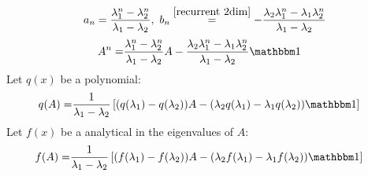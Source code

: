 \documentclass{article}
\begin{document}
\begin{align}
a_n = \frac {\lambda_1^n - \lambda_2^n}{\lambda_1 - \lambda_2},\ b_n \overset{\eqref{recurrent 2dim}}=-\frac {\lambda_2\lambda_1^n - \lambda_1\lambda_2^n}{\lambda_1 - \lambda_2}
\end{align}
\begin{align}
A^n =& \frac {\lambda_1^n - \lambda_2^n}{\lambda_1 - \lambda_2} A - \frac {\lambda_2\lambda_1^n - \lambda_1\lambda_2^n}{\lambda_1 - \lambda_2} \mathbbm 1
\end{align}
Let $q(x)$ be a polynomial:
\begin{align}
q(A) =& \frac 1{\lambda_1 - \lambda_2} \left[(q(\lambda_1) - q(\lambda_2))A - (\lambda_2 q(\lambda_1) - \lambda_1 q(\lambda_2)) \mathbbm 1\right]
\end{align}
Let $f(x)$ be a analytical in the eigenvalues of $A$:
\begin{align}
f(A) =& \frac 1{\lambda_1 - \lambda_2} \left[(f(\lambda_1) - f(\lambda_2))A - (\lambda_2 f(\lambda_1) - \lambda_1 f(\lambda_2)) \mathbbm 1\right] \label{func 2dim}
\end{align}
\end{document}
